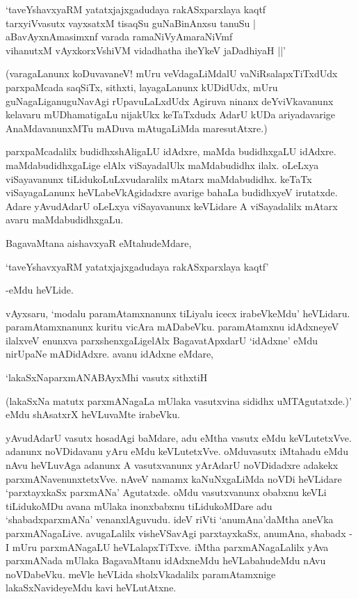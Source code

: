 \begin{shloka}
`taveYshavxyaRM yatatxjajxgadudaya rakASxparxlaya kaqtf\\
tarxyiVvasutx vayxsatxM tisaqSu guNaBinAnxsu tanuSu |\\
aBavAyxnAmasimxnf varada ramaNiVyAmaraNiVmf\\
vihanutxM vAyxkorxVshiVM vidadhatha iheYkeV jaDadhiyaH ||'
\end{shloka}

(varagaLanunx koDuvavaneV! mUru veVdagaLiMdalU vaNiRsalapxTiTxdUdx parxpaMcada saqSiTx, sithxti, layagaLanunx kUDidUdx, mUru guNagaLiganuguNavAgi rUpavuLaLxdUdx Agiruva ninanx deYviVkavanunx kelavaru mUDhamatigaLu nijakUkx keTaTxdudx AdarU kUDa ariyadavarige AnaMdavanunxMTu mADuva mAtugaLiMda maresutAtxre.)

parxpaMcadalilx budidhxshAligaLU idAdxre, maMda budidhxgaLU idAdxre. maMdabudidhxgaLige elAlx viSayadalUlx maMdabudidhx ilalx. oLeLxya viSayavanunx tiLidukoLuLxvudaralilx mAtarx maMdabudidhx. keTaTx viSayagaLanunx heVLabeVkAgidadxre avarige bahaLa budidhxyeV irutatxde. Adare yAvudAdarU oLeLxya viSayavanunx keVLidare A viSayadalilx mAtarx avaru maMdabudidhxgaLu.

BagavaMtana aishavxyaR eMtahudeMdare,

\begin{shloka}
`taveYshavxyaRM yatatxjajxgadudaya rakASxparxlaya kaqtf'
\end{shloka}

-eMdu heVLide.

vAyxsaru, `modalu paramAtamxnanunx tiLiyalu icecx irabeVkeMdu' heVLidaru. paramAtamxnanunx kuritu vicAra mADabeVku. paramAtamxnu idAdxneyeV ilalxveV enunxva parxshenxgaLigelAlx BagavatApxdarU `idAdxne' eMdu nirUpaNe mADidAdxre. avanu idAdxne eMdare,

\begin{shloka}
`lakaSxNaparxmANABAyxMhi vasutx sithxtiH
\end{shloka}

(lakaSxNa matutx parxmANagaLa mUlaka vasutxvina sididhx uMTAgutatxde.)' eMdu shAsatxrX heVLuvaMte irabeVku.

yAvudAdarU vasutx hosadAgi baMdare, adu eMtha vasutx eMdu keVLutetxVve. adanunx noVDidavanu yAru eMdu keVLutetxVve. oMdu\break vasutx iMtahadu eMdu nAvu heVLuvAga adanunx A vasutxvanunx yArAdarU noVDidadxre adakekx parxmANavenunxtetxVve. nAveV namamx kaNuNxgaLiMda noVDi heVLi\-dare `parxtayxkaSx parxmANa' Agutatxde. oMdu vasutxvanunx obabxnu keVLi tiLidukoMDu avana mUlaka inonxbabxnu tiLidukoMDare adu `shabadxparxmANa' venanxlAguvudu. ideV riVti `anumAna'daMtha aneVka parxmANagaLive. avugaLalilx visheVSavAgi parxtayxkaSx, anumAna, shabadx - I mUru parxmANagaLU heVLalapxTiTxve. iMtha parxmANagaLalilx yAva parxmANada mUlaka BagavaMtanu idAdxneMdu heVLabahudeMdu nAvu noVDabeVku. meVle heVLida sholxVkadalilx paramAtamxnige lakaSxNavideyeMdu kavi heVLutAtxne.

